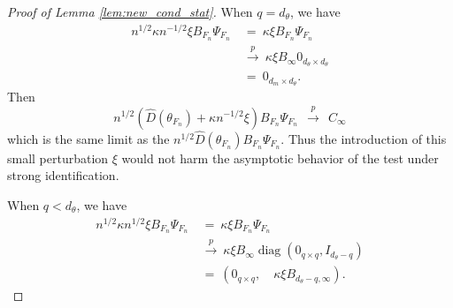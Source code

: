 \documentclass[11pt]{article}
\theoremstyle{definition}
\DeclareMathOperator*{\diag}{diag}
\newcommand{\0}{\ensuremath{\mathbf{0}}}
\begin{document}
\begin{bibunit}
\begin{proof}[Proof of Lemma \ref{lem:new_cond_stat}]
	When $q = d_\theta$, we have
	\begin{align*}
		n^{1/2} \kappa n^{-1/2} \xi B_{F_n} \Psi_{F_n} 
		&~=~ \kappa \xi B_{F_n} \Psi_{F_n} \\
		&~\xrightarrow{p}~ \kappa \xi B_{\infty} 0_{d_\theta \times d_\theta} \\
		&~=~ 0_{d_m \times d_\theta}.
	\end{align*}
	Then 
	\[
		n^{1/2} (\hat{D}(\theta_{F_n}) + \kappa n^{-1/2}\xi) B_{F_n} \Psi_{F_n} 
		~~\xrightarrow{p}~~
		C_\infty	
	\]
	which is the same limit as the $n^{1/2} \hat{D}(\theta_{F_n}) B_{F_n} \Psi_{F_n}$. Thus the introduction of this small perturbation $\xi$ would not harm the asymptotic behavior of the test under strong identification.

	When $q < d_\theta$, we have 
	\begin{align*}
		n^{1/2} \kappa n^{1/2} \xi B_{F_n} \Psi_{F_n}
		&~=~ \kappa \xi B_{F_n} \Psi_{F_n} \\
		&~\xrightarrow{p}~ \kappa \xi B_{\infty} \diag(0_{q\times q}, I_{d_\theta - q}) \\
		&~=~ (0_{q\times q}, \quad \kappa \xi B_{d_\theta - q,\infty}).
	\end{align*}


\end{proof}
\end{bibunit}
\end{document}

